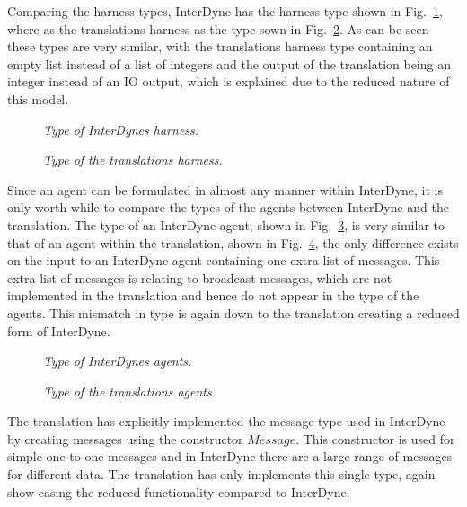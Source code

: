 \documentclass{article}
\begin{document}
Comparing the harness types, InterDyne has the harness type shown in Fig.~\ref{fig:harntypint}, where as the translations harness as the type sown in Fig.~\ref{fig:harntyptrans}. As can be seen these types are very similar, with the translations harness type containing an empty list instead of a list of integers and the output of the translation being an integer instead of an IO output, which is explained due to the reduced nature of this model. 
\begin{figure}[H]
	\centering
	
	\caption{\it Type of InterDynes harness.}
	\label{fig:harntypint}
\end{figure} 
\begin{figure}[H]
	\centering
	
	\caption{\it Type of the translations harness.}
	\label{fig:harntyptrans}
\end{figure} 

Since an agent can be formulated in almost any manner within InterDyne, it is only worth while to compare the types of the agents between InterDyne and the translation. The type of an InterDyne agent, shown in Fig.~\ref{fig:agentpint}, is very similar to that of an agent within the translation, shown in Fig.~\ref{fig:agenttrans}, the only difference exists on the input to an InterDyne agent containing one extra list of messages. This extra list of messages is relating to broadcast messages, which are not implemented in the translation and hence do not appear in the type of the agents. This mismatch in type is again down to the translation creating a reduced form of InterDyne. 
\begin{figure}[H]
	\centering
	
	\caption{\it Type of InterDynes agents.}
	\label{fig:agentpint}
\end{figure} 
\begin{figure}[H]
	\centering
	
	\caption{\it Type of the translations agents.}
	\label{fig:agenttrans}
\end{figure} 

The translation has explicitly implemented the message type used in InterDyne by creating messages using the constructor $Message$. This constructor is used for simple one-to-one messages and in InterDyne there are a large range of messages for different data. The translation has only implements this single type, again show casing the reduced functionality compared to InterDyne.   
\end{document}
